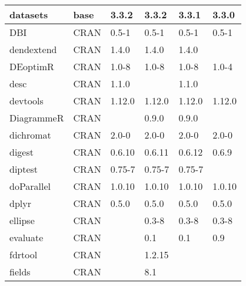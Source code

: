 \begin{longtable}{@{\extracolsep{\fill}}|l|l|l|l|l|l|@{}}
datasets                      & base                      & 3.3.2       & 3.3.2       & 3.3.1          & 3.3.0            \\ \hline
DBI                           & CRAN                      & 0.5-1       & 0.5-1       & 0.5-1          & 0.5-1            \\ \hline
dendextend                    & CRAN                      & 1.4.0       & 1.4.0       & 1.4.0          &                  \\ \hline
DEoptimR                      & CRAN                      & 1.0-8       & 1.0-8       & 1.0-8          & 1.0-4            \\ \hline
desc                          & CRAN                      & 1.1.0       &             & 1.1.0          &                  \\ \hline
devtools                      & CRAN                      & 1.12.0      & 1.12.0      & 1.12.0         & 1.12.0           \\ \hline
DiagrammeR                    & CRAN                      &             & 0.9.0       & 0.9.0          &                  \\ \hline
dichromat                     & CRAN                      & 2.0-0       & 2.0-0       & 2.0-0          & 2.0-0            \\ \hline
digest                        & CRAN                      & 0.6.10      & 0.6.11      & 0.6.12         & 0.6.9            \\ \hline
diptest                       & CRAN                      & 0.75-7      & 0.75-7      & 0.75-7         &                  \\ \hline
doParallel                    & CRAN                      & 1.0.10      & 1.0.10      & 1.0.10         & 1.0.10           \\ \hline
dplyr                         & CRAN                      & 0.5.0       & 0.5.0       & 0.5.0          & 0.5.0            \\ \hline
ellipse                       & CRAN                      &             & 0.3-8       & 0.3-8          & 0.3-8            \\ \hline
evaluate                      & CRAN                      &             & 0.1         & 0.1            & 0.9              \\ \hline
fdrtool                       & CRAN                      &             & 1.2.15      &                &                  \\ \hline
fields                        & CRAN                      &             & 8.1         &                &                  \\ \hline

\end{longtable}
